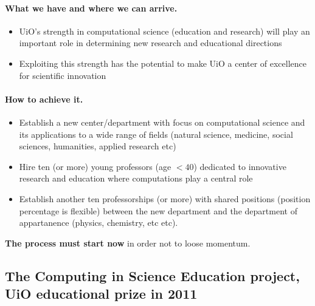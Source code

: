 \documentclass[%
oneside,                 %
final,                   %
10pt]{article}
\begin{document}
\paragraph{What we have and where we can arrive.}
\begin{itemize}
\item UiO's strength in computational science (education and research) will play an important role in  determining new research and educational directions

\item Exploiting this strength has the potential to make UiO a center of excellence for scientific innovation
\end{itemize}

\noindent




\paragraph{How to achieve it.}
\begin{itemize}
\item Establish  a new center/department with focus on computational science and its applications to a wide range of fields (natural science, medicine, social sciences, humanities, applied research etc)

\item Hire ten (or more) young professors (age $< 40$) dedicated to innovative research and education where computations play a central role

\item Establish another ten professorships (or more) with  shared positions (position percentage  is flexible) between the  new department and the department of appartanence (physics, chemistry, etc etc).
\end{itemize}

\noindent



\textbf{The process must start now} in order not to loose momentum.



\subsection*{The Computing in Science Education project, UiO educational prize in 2011}
\end{document}
